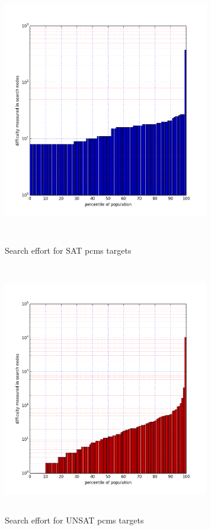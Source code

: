 \documentclass{l4proj}
\begin{document}
\begin{figure}[H]
\centering
\begin{minipage}[t]{.5\textwidth}
  \centering
  \includegraphics[height=11cm,width=9cm]{images/plots/pcmsSAT.png}
  \caption{Search effort for SAT pcms targets}
  \label{pcms:SAT}
\end{minipage}%
\begin{minipage}[t]{.5\textwidth}
  \centering
  \includegraphics[height=11cm,width=9cm]{images/plots/pcmsUNSAT.png}
  \caption{Search effort for UNSAT pcms targets}
  \label{pcms:UNSAT}
\end{minipage}
\end{figure}
\end{document}
